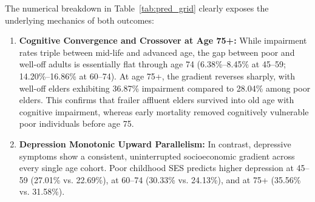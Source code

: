 \begin{table}[!htbp]
\centering
\small
\caption{\textbf{Standardized Predicted Prevalence (\%) of Cognitive Impairment and Depressive Symptoms by Age Group and Childhood SES (Model B, 95\% CI).}}
\label{tab:pred_grid}
\end{table}

The numerical breakdown in Table~\ref{tab:pred_grid} clearly exposes the underlying mechanics of both outcomes:
\begin{enumerate}
    \item \textbf{Cognitive Convergence and Crossover at Age 75+:} While impairment rates triple between mid-life and advanced age, the gap between poor and well-off adults is essentially flat through age 74 (6.38\%--8.45\% at 45--59; 14.20\%--16.86\% at 60--74). At age 75+, the gradient reverses sharply, with well-off elders exhibiting 36.87\% impairment compared to 28.04\% among poor elders. This confirms that frailer affluent elders survived into old age with cognitive impairment, whereas early mortality removed cognitively vulnerable poor individuals before age 75.
    \item \textbf{Depression Monotonic Upward Parallelism:} In contrast, depressive symptoms show a consistent, uninterrupted socioeconomic gradient across every single age cohort. Poor childhood SES predicts higher depression at 45--59 (27.01\% vs. 22.69\%), at 60--74 (30.33\% vs. 24.13\%), and at 75+ (35.56\% vs. 31.58\%).
\end{enumerate}

